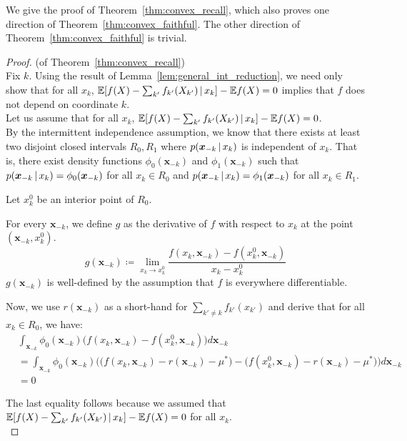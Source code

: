 We give the proof of Theorem~\ref{thm:convex_recall}, which also proves one direction of Theorem~\ref{thm:convex_faithful}. The other direction of Theorem~\ref{thm:convex_faithful} is trivial.

\begin{proof} (of Theorem~\ref{thm:convex_recall})\\
Fix $k$. Using the result of Lemma~\ref{lem:general_int_reduction}, we need only show that for all $x_k$, $ {\mathbb E}[ f(X) - \sum_{k'} f_{k'}(X_{k'}) {\,|\,} x_k] - {\mathbb E} f(X) = 0 $ implies that $f$ does not depend on coordinate $k$.\\

Let us assume that for all $x_k$, $ {\mathbb E}[ f(X) - \sum_{k'} f_{k'}(X_{k'}) {\,|\,} x_k] - {\mathbb E} f(X) = 0 $.\\

By the intermittent independence assumption, we know that there exists at least two disjoint closed intervals $R_0, R_1$ where $p(\mbox{\boldmath $x$}_{-k} {\,|\,} x_k)$ is independent of $x_k$. That is, there exist density functions $\phi_0(\mathbf{x}_{-k})$ and $\phi_1(\mathbf{x}_{-k})$ such that $p(\mbox{\boldmath $x$}_{-k} {\,|\,} x_k) = \phi_0(\mbox{\boldmath $x$}_{-k})$ for all $x_k \in R_0$ and $p(\mbox{\boldmath $x$}_{-k} {\,|\,} x_k) = \phi_1(\mbox{\boldmath $x$}_{-k})$ for all $x_k \in R_1$.


Let $x^0_k$ be an interior point of $R_0$. 

For every $\mathbf{x}_{-k}$, we define $g$ as the derivative of $f$ with respect to $x_k$ at the point $(\mathbf{x}_{-k}, x^0_k)$.
\[
g(\mathbf{x}_{-k}) \coloneqq  \lim_{x_k \rightarrow x^0_k} 
     \frac{f(x_k, \mathbf{x}_{-k}) - f(x^0_k, \mathbf{x}_{-k})}{x_k - x^0_k}
\]
$g(\mathbf{x}_{-k})$ is well-defined by the assumption that $f$ is everywhere differentiable.

Now, we use $r(\mathbf{x}_{-k})$ as a short-hand for $\sum_{k'\neq k} f_{k'}(x_{k'})$ and derive that for all $x_k \in R_0$, we have:
\begin{align*} 
& \int_{\mathbf{x}_{-k}}  \phi_0(\mathbf{x}_{-k}) 
   \Big( f(x_k, \mathbf{x}_{-k}) - f(x_k^0, \mathbf{x}_{-k}) \Big) d\mathbf{x}_{-k} \\
 &= \int_{\mathbf{x}_{-k}}  \phi_0(\mathbf{x}_{-k})
   \Big( \big(f(x_k, \mathbf{x}_{-k}) - r(\mathbf{x}_{-k}) - \mu^* \big) - 
         \big(f(x^0_k, \mathbf{x}_{-k}) - r(\mathbf{x}_{-k}) - \mu^* \big) \Big)
     d \mathbf{x}_{-k} \\
 &= 0
\end{align*}

The last equality follows because we assumed that $ {\mathbb E}[ f(X) - \sum_{k'} f_{k'}(X_{k'}) {\,|\,} x_k] - {\mathbb E} f(X) = 0 $ for all $x_k$. \\


\end{proof}
